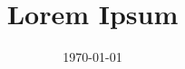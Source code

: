 \documentclass{compactlayout}
\title{Lorem Ipsum}
\date{\today}
\begin{document}
\begin{multicols*}{4}

\maketitle



\end{multicols*}
\end{document}
